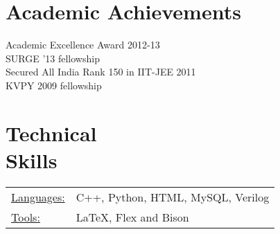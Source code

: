 \documentclass[margin]{res}
\begin{document}
\begin{resume}
\begin{itemize}
                
		 \end{itemize}

\section{Academic Achievements} 
Academic Excellence Award 2012-13 \\
SURGE '13 fellowship \\
Secured All India Rank 150 in IIT-JEE 2011 \\
KVPY 2009 fellowship

\section{Technical \\ Skills}
   \begin{tabular}{l p{3in}}
    \underline{Languages:} & C++, Python, HTML, MySQL, Verilog \\

     \underline{Tools:} &  \LaTeX, Flex and Bison
 \end{tabular}

\end{resume} 
\end{document}
